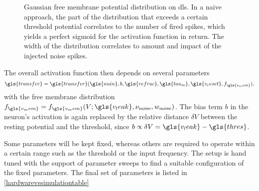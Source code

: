 %
\begin{figure}
	\begin{center}
		
	\end{center}
	\caption[Gaussian free membrane potential distribution on \gls{dls}.]{Gaussian free membrane potential distribution on \gls{dls}. In a naive approach, the part of the distribution that exceeds a certain threshold potential correlates to the number of fired spikes, which yields a perfect sigmoid for the activation function in return. The width of the distribution correlates to amount and impact of the injected noise spikes.}
	\label{vleak_w_noise}
\end{figure}

 The overall activation function then depends on several parameters
\begin{equation}
\gls{transfer} = \gls{transfer}(\gls{nuin}, b, \gls{refrac}, \gls{tau_m}, \gls{v_reset}, f_{\gls{v_mem}}),
\end{equation}
with the free membrane distribution $f_{\gls{v_mem}} = f_{\gls{v_mem}}(V; \gls{v_leak}, \nu_\text{noise}, w_\text{noise})$. 
The bias term $b$ in the neuron's activation is again replaced by the relative distance $\delta V$ between the resting potential and the threshold, since $b \propto \delta V = \gls{v_leak} - \gls{thres}$. 

Some parameters will be kept fixed, whereas others are required to operate within a certain range such as the threshold or the input frequency. The setup is hand tuned with the support of parameter sweeps to find a suitable configuration of the fixed parameters. The final set of parameters is listed in \cref{hardwarevssimulationtable}

